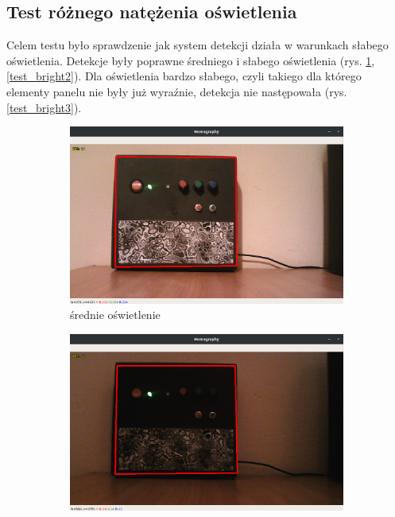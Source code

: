 \documentclass[12pt,twoside,polish]{article}
\begin{document}
\subsection{Test różnego natężenia oświetlenia}
Celem testu było sprawdzenie jak system detekcji działa w warunkach słabego oświetlenia. Detekcje były poprawne średniego i słabego oświetlenia (rys. \ref{test_bright1}, \ref{test_bright2}). Dla oświetlenia bardzo słabego, czyli takiego dla którego elementy panelu nie były już wyraźnie, detekcja nie następowała (rys. \ref{test_bright3}).
\begin{figure}[htb!]
	\begin{subfigure}[b]{0.5\textwidth}
		\includegraphics[width=\textwidth]{test_bright1}
		\caption{średnie oświetlenie}
		\label{test_bright1}
	\end{subfigure}
	\begin{subfigure}[b]{0.5\textwidth}
		\includegraphics[width=\textwidth]{test_bright3}

\end{subfigure}
\end{figure}
\end{document}

